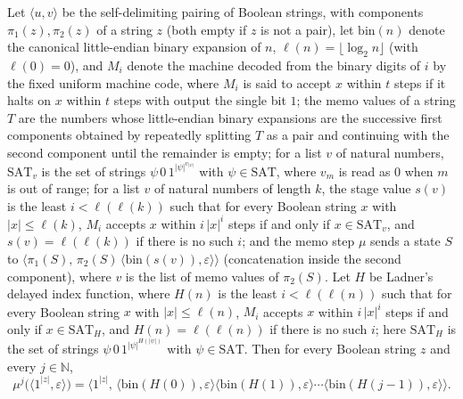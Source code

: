 \begin{theorem}
\label{Complexity.ladner_memo_orbit}
\leanok
{}
Let $\langle u,v\rangle$ be the self-delimiting pairing of Boolean strings, with components $\pi_1(z),\pi_2(z)$ of a string $z$ (both empty if $z$ is not a pair), let $\mathrm{bin}(n)$ denote the canonical little-endian binary expansion of $n$, $\ell(n)=\lfloor\log_2 n\rfloor$ (with $\ell(0)=0$), and $M_i$ denote the machine decoded from the binary digits of $i$ by the fixed uniform machine code, where $M_i$ is said to accept $x$ within $t$ steps if it halts on $x$ within $t$ steps with output the single bit $1$; the memo values of a string $T$ are the numbers whose little-endian binary expansions are the successive first components obtained by repeatedly splitting $T$ as a pair and continuing with the second component until the remainder is empty; for a list $v$ of natural numbers, $\mathrm{SAT}_v$ is the set of strings $\psi\,0\,1^{|\psi|^{v_{|\psi|}}}$ with $\psi\in\mathrm{SAT}$, where $v_m$ is read as $0$ when $m$ is out of range; for a list $v$ of natural numbers of length $k$, the stage value $s(v)$ is the least $i<\ell(\ell(k))$ such that for every Boolean string $x$ with $|x|\le\ell(k)$, $M_i$ accepts $x$ within $i\,|x|^i$ steps if and only if $x\in\mathrm{SAT}_v$, and $s(v)=\ell(\ell(k))$ if there is no such $i$; and the memo step $\mu$ sends a state $S$ to $\langle\pi_1(S),\,\pi_2(S)\,\langle\mathrm{bin}(s(v)),\varepsilon\rangle\rangle$ (concatenation inside the second component), where $v$ is the list of memo values of $\pi_2(S)$. Let $H$ be Ladner's delayed index function, where $H(n)$ is the least $i<\ell(\ell(n))$ such that for every Boolean string $x$ with $|x|\le\ell(n)$, $M_i$ accepts $x$ within $i\,|x|^i$ steps if and only if $x\in\mathrm{SAT}_H$, and $H(n)=\ell(\ell(n))$ if there is no such $i$; here $\mathrm{SAT}_H$ is the set of strings $\psi\,0\,1^{|\psi|^{H(|\psi|)}}$ with $\psi\in\mathrm{SAT}$. Then for
every Boolean string $z$ and every $j\in\mathbb N$,
\[
  \mu^{j}\bigl(\langle 1^{|z|},\varepsilon\rangle\bigr)
  =\bigl\langle 1^{|z|},\,\langle\mathrm{bin}(H(0)),\varepsilon\rangle\langle\mathrm{bin}(H(1)),\varepsilon\rangle
  \cdots\langle\mathrm{bin}(H(j-1)),\varepsilon\rangle\bigr\rangle.
\]
\end{theorem}

